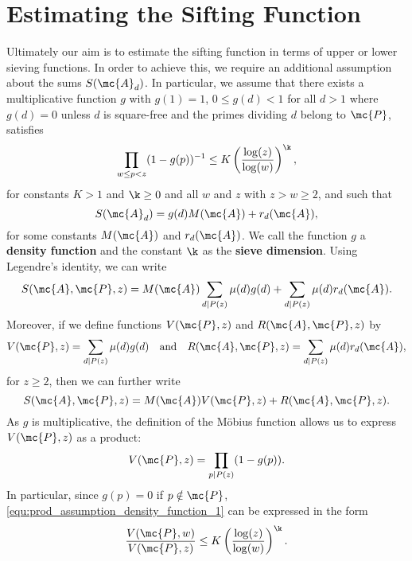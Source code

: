   \section{Estimating the Sifting Function}
    Ultimately our aim is to estimate the sifting function in terms of upper or lower sieving functions. In order to achieve this, we require an additional assumption about the sums $S(\mc{A}_{d})$. In particular, we assume that there exists a multiplicative function $g$ with $g(1) = 1$, $0 \le g(d) < 1$ for all $d > 1$ where $g(d) = 0$ unless $d$ is square-free and the primes dividing $d$ belong to $\mc{P}$, satisfies
    \begin{equation}\label{equ:prod_assumption_density_function_1}
      \prod_{w \le p < z}(1-g(p))^{-1} \le K\left(\frac{\log(z)}{\log(w)}\right)^{\k},
    \end{equation}
    for constants $K > 1$ and $\k \ge 0$ and all $w$ and $z$ with $z > w \ge 2$, and such that  
    \begin{equation}\label{equ:d_multiple_sifting_function}
      S(\mc{A}_{d}) = g(d)M(\mc{A})+r_{d}(\mc{A}),
    \end{equation}
    for some constants $M(\mc{A})$ and $r_{d}(\mc{A})$. We call the function $g$ a \textbf{density function} and the constant $\k$ as the \textbf{sieve dimension}. Using Legendre's identity, we can write
    \[
      S(\mc{A},\mc{P},z) = M(\mc{A})\sum_{d \mid P(z)}\mu(d)g(d)+\sum_{d \mid P(z)}\mu(d)r_{d}(\mc{A}).
    \]
    Moreover, if we define functions $V(\mc{P},z)$ and $R(\mc{A},\mc{P},z)$ by
    \[
      V(\mc{P},z) = \sum_{d \mid P(z)}\mu(d)g(d) \quad \text{and} \quad R(\mc{A},\mc{P},z) = \sum_{d \mid P(z)}\mu(d)r_{d}(\mc{A}),
    \]
    for $z \ge 2$, then we can further write
    \[
      S(\mc{A},\mc{P},z) = M(\mc{A})V(\mc{P},z)+R(\mc{A},\mc{P},z).
    \]
    As $g$ is multiplicative, the definition of the M\"obius function allows us to express $V(\mc{P},z)$ as a product:
    \begin{equation}\label{equ:V_product_formula}
      V(\mc{P},z) = \prod_{p \mid P(z)}(1-g(p)).
    \end{equation}
    In particular, since $g(p) = 0$ if $p \notin \mc{P}$, \cref{equ:prod_assumption_density_function_1} can be expressed in the form
    \begin{equation}\label{equ:prod_assumption_density_function_2}
      \frac{V(\mc{P},w)}{V(\mc{P},z)} \le K\left(\frac{\log(z)}{\log(w)}\right)^{\k}.
    \end{equation}
